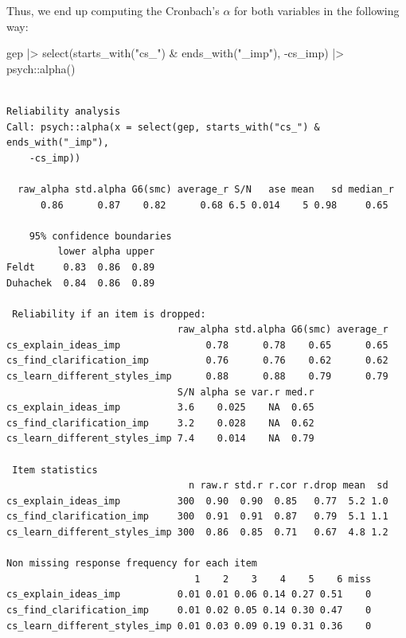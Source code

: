 \documentclass[
  letterpaper,
  DIV=11,
  numbers=noendperiod]{scrreprt}
\newenvironment{Shaded}{\begin{snugshade}}{\end{snugshade}}
\newcommand{\FunctionTok}[1]{\textcolor[rgb]{0.28,0.35,0.67}{#1}}
\newcommand{\NormalTok}[1]{\textcolor[rgb]{0.00,0.23,0.31}{#1}}
\newcommand{\SpecialCharTok}[1]{\textcolor[rgb]{0.37,0.37,0.37}{#1}}
\newcommand{\StringTok}[1]{\textcolor[rgb]{0.13,0.47,0.30}{#1}}
\begin{document}
Thus, we end up computing the Cronbach's \(\alpha\) for both variables
in the following way:

\begin{Shaded}
\begin{Highlighting}[]
\NormalTok{gep }\SpecialCharTok{|\textgreater{}}
  \FunctionTok{select}\NormalTok{(}\FunctionTok{starts\_with}\NormalTok{(}\StringTok{"cs\_"}\NormalTok{) }\SpecialCharTok{\&} \FunctionTok{ends\_with}\NormalTok{(}\StringTok{"\_imp"}\NormalTok{), }\SpecialCharTok{{-}}\NormalTok{cs\_imp) }\SpecialCharTok{|\textgreater{}}
\NormalTok{  psych}\SpecialCharTok{::}\FunctionTok{alpha}\NormalTok{()}
\end{Highlighting}
\end{Shaded}

\begin{verbatim}

Reliability analysis   
Call: psych::alpha(x = select(gep, starts_with("cs_") & ends_with("_imp"), 
    -cs_imp))

  raw_alpha std.alpha G6(smc) average_r S/N   ase mean   sd median_r
      0.86      0.87    0.82      0.68 6.5 0.014    5 0.98     0.65

    95% confidence boundaries 
         lower alpha upper
Feldt     0.83  0.86  0.89
Duhachek  0.84  0.86  0.89

 Reliability if an item is dropped:
                              raw_alpha std.alpha G6(smc) average_r
cs_explain_ideas_imp               0.78      0.78    0.65      0.65
cs_find_clarification_imp          0.76      0.76    0.62      0.62
cs_learn_different_styles_imp      0.88      0.88    0.79      0.79
                              S/N alpha se var.r med.r
cs_explain_ideas_imp          3.6    0.025    NA  0.65
cs_find_clarification_imp     3.2    0.028    NA  0.62
cs_learn_different_styles_imp 7.4    0.014    NA  0.79

 Item statistics 
                                n raw.r std.r r.cor r.drop mean  sd
cs_explain_ideas_imp          300  0.90  0.90  0.85   0.77  5.2 1.0
cs_find_clarification_imp     300  0.91  0.91  0.87   0.79  5.1 1.1
cs_learn_different_styles_imp 300  0.86  0.85  0.71   0.67  4.8 1.2

Non missing response frequency for each item
                                 1    2    3    4    5    6 miss
cs_explain_ideas_imp          0.01 0.01 0.06 0.14 0.27 0.51    0
cs_find_clarification_imp     0.01 0.02 0.05 0.14 0.30 0.47    0
cs_learn_different_styles_imp 0.01 0.03 0.09 0.19 0.31 0.36    0
\end{verbatim}
\end{document}
